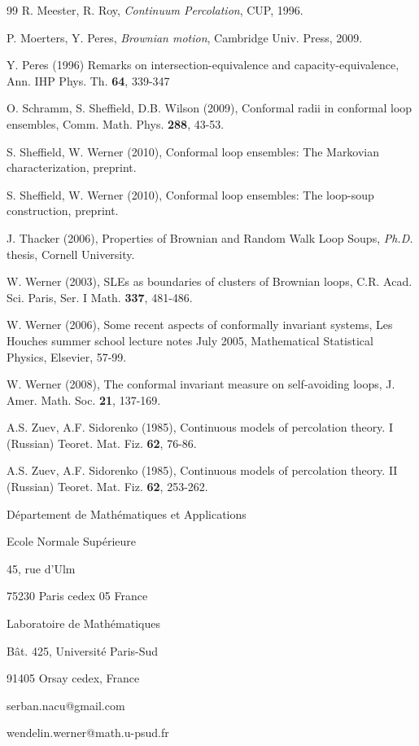 \documentclass[11pt]{article}
\begin{document}
\begin {thebibliography}{99}
{R. Meester, R. Roy,
{\em Continuum Percolation},
CUP, 1996.}

{P. Moerters, Y. Peres, 
{\em Brownian motion},
Cambridge Univ. Press, 2009.}

{Y. Peres (1996)
Remarks on intersection-equivalence and capacity-equivalence,
Ann. IHP Phys. Th. {\bf  64}, 339-347
}

{O. Schramm, S. Sheffield, D.B. Wilson (2009),
 Conformal radii in conformal loop ensembles, Comm. Math. Phys. {\bf 288}, 43-53.}


{S. Sheffield, W. Werner (2010),
Conformal loop ensembles: The Markovian characterization,
preprint.}

{S. Sheffield, W. Werner (2010),
Conformal loop ensembles: The loop-soup construction, 
preprint.}

{J. Thacker (2006),
Properties of Brownian and Random Walk Loop Soups, 
{\it Ph.D.} thesis, Cornell University. }

{W. Werner (2003),
SLEs as boundaries of clusters of Brownian loops, 
C.R. Acad. Sci. Paris, Ser. I Math. {\bf 337}, 481-486.}

{W. Werner (2006),
 Some recent aspects of conformally invariant systems, Les Houches summer school lecture notes July 2005, Mathematical Statistical Physics, Elsevier, 57-99.}
 
{W. Werner (2008),
The conformal invariant measure on self-avoiding loops, 
J. Amer. Math. Soc. {\bf 21}, 137-169.
}

{A.S. Zuev, A.F. Sidorenko
(1985),
 Continuous models of percolation theory. I (Russian) Teoret. Mat. Fiz. {\bf 62}, 76-86.}
 
{A.S. Zuev, A.F. Sidorenko
(1985),
 Continuous models of percolation theory. II (Russian) Teoret. Mat. Fiz. {\bf 62}, 253-262.}

 
\end{thebibliography}


D\'epartement de Math\'ematiques et Applications 

Ecole Normale Sup\'erieure 

45, rue d'Ulm

75230 Paris cedex 05 France







\medbreak


Laboratoire de Math\'ematiques 

B\^at. 425, Universit\'e Paris-Sud 

91405 Orsay cedex, France


\medbreak

serban.nacu@gmail.com

wendelin.werner@math.u-psud.fr
\end{document}
